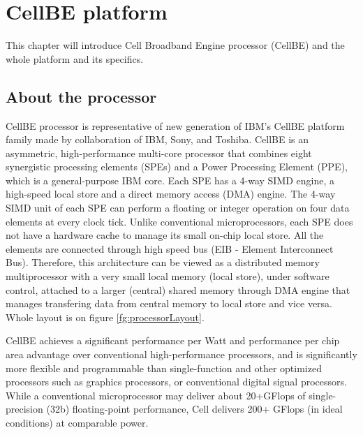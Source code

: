 \chapter{CellBE platform}

This chapter will introduce Cell Broadband Engine processor (CellBE) and the whole platform and its specifics.

\section{About the processor}

CellBE processor is representative of new generation of IBM's CellBE platform family made by collaboration of IBM, Sony, and Toshiba. CellBE is an asymmetric, high-performance multi-core processor that combines eight synergistic processing elements (SPEs) and a Power Processing Element (PPE), which is a general-purpose IBM  core. Each SPE has a 4-way SIMD engine, a high-speed local store and a direct memory access (DMA) engine. The 4-way SIMD unit of each SPE can perform a floating or integer operation on four data elements at every clock tick. Unlike conventional microprocessors, each SPE does not have a hardware cache to manage its small on-chip local store. All the elements are connected through high speed bus (EIB - Element Interconnect Bus). Therefore, this architecture can be viewed as a distributed memory multiprocessor with a very small local memory (local store), under software control, attached to a larger (central) shared memory through DMA engine that manages transfering data from central memory to local store and vice versa. Whole layout is on figure \ref{fg:processorLayout}.

CellBE achieves a significant performance per Watt and performance per chip area advantage over conventional high-performance processors, and is significantly more flexible and programmable than single-function and other optimized processors such as graphics processors, or conventional digital signal processors. While a conventional microprocessor may deliver about 20+GFlops of single-precision (32b) floating-point performance, Cell delivers 200+ GFlops (in ideal conditions) at comparable power.


